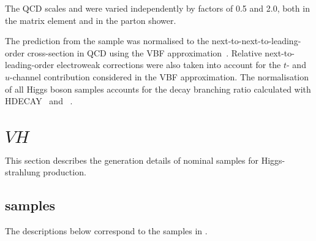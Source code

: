 The QCD scales \muR and \muF were varied independently by factors of 0.5 and 2.0, both in the matrix element
and in the parton shower.

The prediction from the \POWHEGBOX sample was normalised to the next-to-next-to-leading-order cross-section in QCD
using the VBF approximation~\cite{Ciccolini:2007jr,Ciccolini:2007ec,Bolzoni:2010xr}. Relative
next-to-leading-order electroweak corrections were also taken into account for the \(t\)- and \(u\)-channel contribution
considered in the VBF approximation. The normalisation of all Higgs boson samples accounts for the decay branching
ratio calculated with \textsc{HDECAY}~\cite{Djouadi:1997yw,Spira:1997dg,Djouadi:2006bz} and
\PROPHECY~\cite{Bredenstein:2006ha,Bredenstein:2006rh,Bredenstein:2006nk}.


\section{\(VH\)}

This section describes the generation details of nominal samples for Higgs-strahlung production.

\subsection*{\texorpdfstring{\POWPY[8]}{Powheg+Pythia8} samples}

The descriptions below correspond to the samples in .

